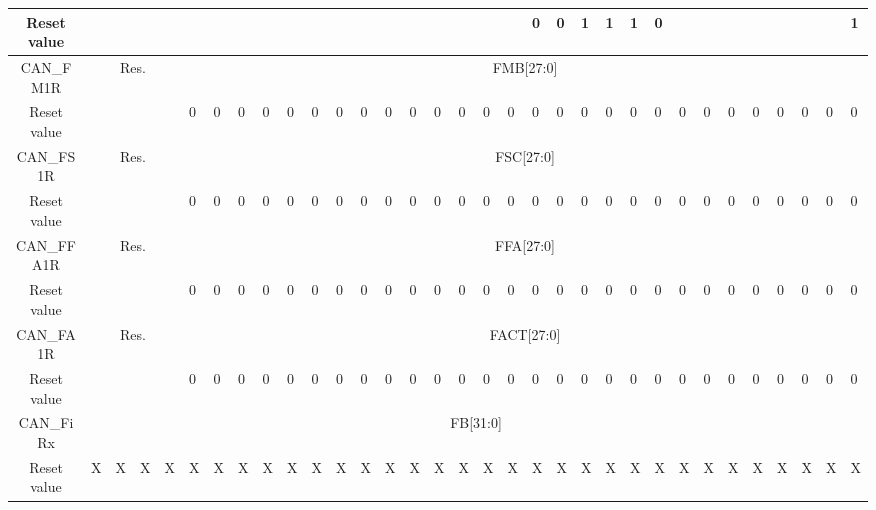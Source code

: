 \begin{table}[H]
{\begin{tabular}{|c|c|l|l|l|l|l|l|l|l|l|l|l|l|l|l|l|l|l|l|l|l|l|l|l|l|l|l|l|l|l|l|l|}
		\hline
		Reset value & & & & & & & & & & & & & & & & & & & 0 & 0 & 1 & 1 & 1 & 0 & & & & & & & & 1 \\
		\hline
		CAN\_FM1R & \multicolumn{4}{c|}{Res.} & \multicolumn{28}{c|}{FMB[27:0]} \\
		\hline
		Reset value & & & & & 0 & 0 & 0 & 0 & 0 & 0 & 0 & 0 & 0 & 0 & 0 & 0 & 0 & 0 & 0 & 0 & 0 & 0 & 0 & 0 & 0 & 0 & 0 & 0 & 0 & 0 & 0 & 0 \\
		\hline
		CAN\_FS1R & \multicolumn{4}{c|}{Res.} & \multicolumn{28}{c|}{FSC[27:0]} \\
		\hline
		Reset value & & & & & 0 & 0 & 0 & 0 & 0 & 0 & 0 & 0 & 0 & 0 & 0 & 0 & 0 & 0 & 0 & 0 & 0 & 0 & 0 & 0 & 0 & 0 & 0 & 0 & 0 & 0 & 0 & 0 \\
		\hline
		CAN\_FFA1R & \multicolumn{4}{c|}{Res.} & \multicolumn{28}{c|}{FFA[27:0]} \\
		\hline
		Reset value & & & & & 0 & 0 & 0 & 0 & 0 & 0 & 0 & 0 & 0 & 0 & 0 & 0 & 0 & 0 & 0 & 0 & 0 & 0 & 0 & 0 & 0 & 0 & 0 & 0 & 0 & 0 & 0 & 0 \\
		\hline
		CAN\_FA1R & \multicolumn{4}{c|}{Res.} & \multicolumn{28}{c|}{FACT[27:0]} \\
		\hline
		Reset value & & & & & 0 & 0 & 0 & 0 & 0 & 0 & 0 & 0 & 0 & 0 & 0 & 0 & 0 & 0 & 0 & 0 & 0 & 0 & 0 & 0 & 0 & 0 & 0 & 0 & 0 & 0 & 0 & 0 \\
		\hline
		CAN\_FiRx & \multicolumn{32}{c|}{FB[31:0]} \\
		\hline
		Reset value & X & X & X & X & X & X & X & X & X & X & X & X & X & X & X & X & X & X & X & X & X & X & X & X & X & X & X & X & X & X & X & X \\
		\hline
	\end{tabular}%
	}
	\label{Tab:f407_dma_register_map_2}
\end{table}